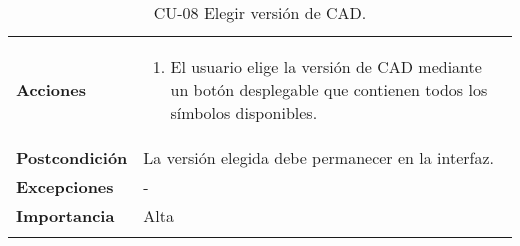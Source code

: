 \begin{longtable}[H]{@{}ll@{}}
\begin{minipage}[t]{0.23\columnwidth}
\textbf{Acciones}\strut
\end{minipage} & \begin{minipage}[t]{0.71\columnwidth}\raggedright\strut
\begin{enumerate}
\def\labelenumi{\arabic{enumi}.}
\tightlist
\item
 El usuario elige la versión de CAD mediante un botón desplegable que contienen todos los símbolos disponibles.
\end{enumerate}\strut
\end{minipage}\tabularnewline
\begin{minipage}[t]{0.23\columnwidth}\raggedright\strut
\textbf{Postcondición}\strut
\end{minipage} & \begin{minipage}[t]{0.71\columnwidth}\raggedright\strut
  La versión elegida debe permanecer en la interfaz.
\end{minipage}\tabularnewline
\begin{minipage}[t]{0.23\columnwidth}\raggedright\strut
\textbf{Excepciones}\strut
\end{minipage} & \begin{minipage}[t]{0.71\columnwidth}\raggedright\strut
-\strut
\end{minipage}\tabularnewline
\begin{minipage}[t]{0.23\columnwidth}\raggedright\strut
\textbf{Importancia}\strut
\end{minipage} & \begin{minipage}[t]{0.71\columnwidth}\raggedright\strut
Alta\strut
\end{minipage}\tabularnewline
\bottomrule
\caption{CU-08 Elegir versión de CAD.}
\end{longtable}
\strut


